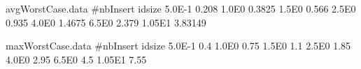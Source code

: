 

\begin{filecontents}{avgWorstCase.data}
#nbInsert idsize  
5.0E-1 0.208 
1.0E0 0.3825
1.5E0 0.566
2.5E0 0.935
4.0E0 1.4675
6.5E0 2.379
1.05E1 3.83149
\end{filecontents}

\begin{filecontents}{maxWorstCase.data}
#nbInsert  idsize  
5.0E-1 0.4
1.0E0 0.75
1.5E0 1.1
2.5E0 1.85
4.0E0 2.95
6.5E0 4.5
1.05E1 7.55
\end{filecontents}